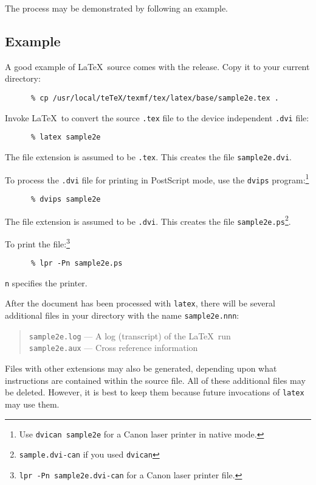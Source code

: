 \documentclass[11pt,twoside]{article}
\newcommand{\xlabel}[1]{}
\begin{document}
The process may be demonstrated by following an example.

\subsection{\xlabel{example}Example}
\label{se:example}
A good example of \LaTeX\ source comes with the release.
Copy it to your current directory:
\begin{verbatim}
      % cp /usr/local/teTeX/texmf/tex/latex/base/sample2e.tex .
\end{verbatim}
Invoke \LaTeX\ to convert the source 
\texttt{.tex} file to the device independent \texttt{.dvi} file:
\begin{verbatim}
      % latex sample2e
\end{verbatim}
The file extension is assumed to be \texttt{.tex}.
This creates the file \texttt{sample2e.dvi}.

To process the \texttt{.dvi} file for printing in PostScript mode, 
use the \texttt{dvips} program:\footnote{Use \texttt{dvican sample2e} 
for a Canon laser printer in native mode.} 

\begin{verbatim}
      % dvips sample2e
\end{verbatim}

The file extension is assumed to be \texttt{.dvi}.
This creates the file \texttt{sample2e.ps}\footnote{\texttt{sample.dvi-can} 
if you used \texttt{dvican}}.

To print the file:\footnote{\texttt{lpr -Pn sample2e.dvi-can} for a Canon laser
printer file.}
\begin{verbatim}
      % lpr -Pn sample2e.ps
\end{verbatim}

\texttt{n} specifies the printer.

After the document has been processed with \texttt{latex}, 
there will be several additional files
in your directory with the name \texttt{sample2e.nnn}:
\begin{quote}
  \texttt{sample2e.log} --- A log (transcript) of the \LaTeX\ run\\
  \texttt{sample2e.aux} --- Cross reference information
\end{quote}

Files with other extensions may also be generated, depending upon what
instructions are contained within the source file. 
All of these additional files may be deleted. However, it is best to keep them
because future invocations of \texttt{latex} may use them.
\end{document}
